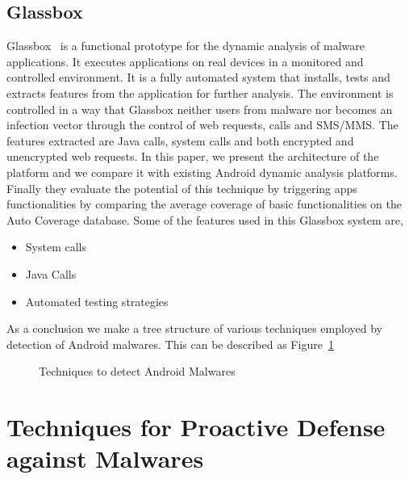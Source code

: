 \documentclass[11pt]{article}
\begin{document}
	\subsection{Glassbox}
	Glassbox~\cite{irolla2016glassbox} is a functional prototype for the dynamic analysis of malware applications. It executes applications on real devices in a monitored and controlled environment. It is a fully automated system that installs, tests and extracts features from the application for further analysis. The environment is controlled in a way that Glassbox neither users from malware nor becomes an infection vector through the control of web requests, calls and SMS/MMS. The features extracted are Java calls, system calls and both encrypted and unencrypted web requests. In this paper, we present
	the architecture of the platform and we compare it with existing Android dynamic analysis platforms.
	Finally they evaluate the potential of this technique by triggering apps functionalities by comparing the average coverage of basic functionalities on the Auto Coverage database. Some of the features used in this Glassbox system are,
	\begin{itemize}
		\item System calls
		\item Java Calls
		\item Automated testing strategies
	\end{itemize}
	As a conclusion we make a tree structure of various techniques employed by detection of Android malwares. This can be described as Figure~\ref{Android}\\
	\begin{figure}[h]
		\centering
		\caption{Techniques to detect Android Malwares}\label{Android}
	\end{figure}
	

	\section{Techniques for Proactive Defense against Malwares}
	
\end{document}
